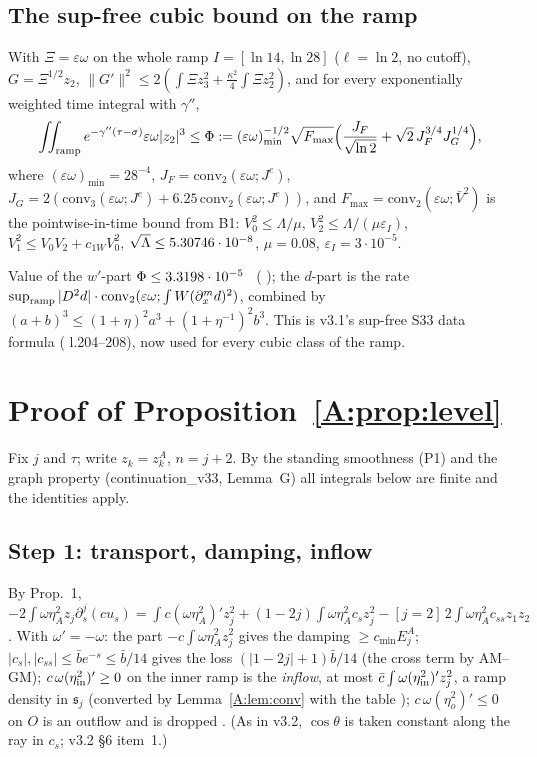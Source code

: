 \documentclass[11pt]{article}
\begin{document}
\subsection{The sup-free cubic bound on the ramp}
\begin{lemma}[$\Phi$; \fn{lemmaU.tex} Lemma~S (sup-free cubic) with $\Xi=\varepsilon\omega$, $L=\kappa$]\label{A:lem:Phi}
With $\Xi=\varepsilon\omega$ on the whole ramp $I=[\ln14,\ln28]$ ($\ell=\ln2$, no cutoff), $G=\Xi^{1/2}z_2$, $\|G'\|^2\le2(\int\Xi z_3^2+\frac{\kappa^2}4\int\Xi z_2^2)$, and for every exponentially weighted time integral with $\gamma''$,
\[
\iint_{\rm ramp}e^{-\gamma''(\tau-\sigma)}\varepsilon\omega|z_2|^3\le\Phi:=(\varepsilon\omega)_{\min}^{-1/2}\sqrt{F_{\max}}\Bigl(\frac{J_F}{\sqrt{\ln2}}+\sqrt2\,J_F^{3/4}J_G^{1/4}\Bigr),
\]
where $(\varepsilon\omega)_{\min}=28^{-4}$, $J_F=\mathrm{conv}_2(\varepsilon\omega;J^e)$, $J_G=2(\mathrm{conv}_3(\varepsilon\omega;J^e)+6.25\,\mathrm{conv}_2(\varepsilon\omega;J^e))$, and $F_{\max}=\mathrm{conv}_2(\varepsilon\omega;\bar V^2)$ is the pointwise-in-time bound from B1: $V_0^2\le\Lambda/\mu$, $V_2^2\le\Lambda/(\mu\varepsilon_I)$, $V_1^2\le V_0V_2+c_{1W}V_0^2$, $\sqrt\Lambda\le5.30746\cdot10^{-8}$, $\mu=0.08$, $\varepsilon_I=3\cdot10^{-5}$.
\end{lemma}
\noindent Value of the $w'$-part $\Phi\le3.3198\cdot10^{-5}$ \tC\ ( ); the $d$-part is the rate $\sup_{\rm ramp}|D^2d|\cdot\mathrm{conv}_2(\varepsilon\omega;\int W(\partial_x^md)^2)$, combined by $(a+b)^3\le(1+\eta)^2a^3+(1+\eta^{-1})^2b^3$. This is v3.1's sup-free S33 data formula ( l.204--208), now used for every cubic class of the ramp.

\section{Proof of Proposition~\ref{A:prop:level}}\label{A:sec:proof}
Fix $j$ and $\tau$; write $z_k=z^A_k$, $n=j+2$. By the standing smoothness (P1) and the graph property (continuation\_v33, Lemma~G) all integrals below are finite and the identities apply.

\subsection{Step 1: transport, damping, inflow}
By  Prop.~1, $-2\int\omega\eta_A^2z_j\partial_s^j(cu_s)=\int c(\omega\eta_A^2)'z_j^2+(1-2j)\int\omega\eta_A^2c_sz_j^2-[j=2]\,2\int\omega\eta_A^2c_{ss}z_1z_2$. With $\omega'=-\omega$: the part $-c\int\omega\eta_A^2z_j^2$ gives the damping $\ge c_{\min}E^A_j$; $|c_s|,|c_{ss}|\le\bar be^{-s}\le\bar b/14$ gives the loss $(|1-2j|+1)\bar b/14$ (the cross term by AM--GM); $c\,\omega(\eta_{\rm in}^2)'\ge0$ on the inner ramp is the \emph{inflow}, at most $\bar c\int\omega(\eta_{\rm in}^2)'z_j^2$, a ramp density in $\mathfrak s_j$ (converted by Lemma~\ref{A:lem:conv} with the table ); $c\,\omega(\eta_o^2)'\le0$ on $O$ is an outflow and is dropped \tP. (As in v3.2, $\cos\theta$ is taken constant along the ray in $c_s$; v3.2 \S6 item~1.)
\end{document}
